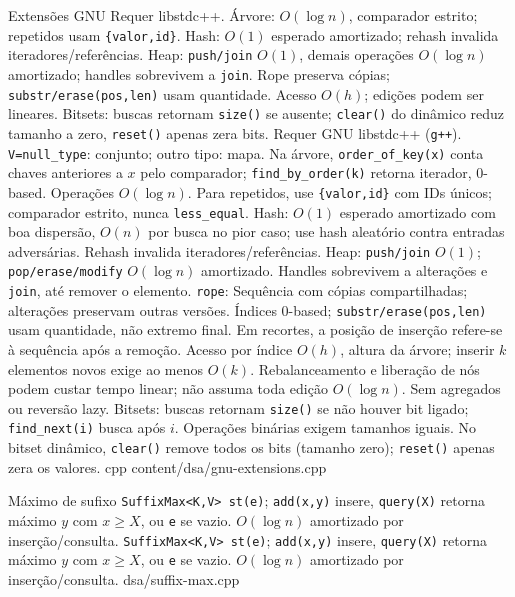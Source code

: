 \mintedentry
{Extensões GNU}
{Requer libstdc++. Árvore: $O(\log n)$, comparador estrito; repetidos usam \texttt{\{valor,id\}}. Hash: $O(1)$ esperado amortizado; rehash invalida iteradores/referências. Heap: \texttt{push/join} $O(1)$, demais operações $O(\log n)$ amortizado; handles sobrevivem a \texttt{join}. Rope preserva cópias; \texttt{substr/erase(pos,len)} usam quantidade. Acesso $O(h)$; edições podem ser lineares. Bitsets: buscas retornam \texttt{size()} se ausente; \texttt{clear()} do dinâmico reduz tamanho a zero, \texttt{reset()} apenas zera bits.}
{Requer GNU libstdc++ (\texttt{g++}). \texttt{V=null\_type}: conjunto; outro tipo: mapa. Na árvore, \texttt{order\_of\_key(x)} conta chaves anteriores a $x$ pelo comparador; \texttt{find\_by\_order(k)} retorna iterador, 0-based. Operações $O(\log n)$. Para repetidos, use \texttt{\{valor,id\}} com IDs únicos; comparador estrito, nunca \texttt{less\_equal}. Hash: $O(1)$ esperado amortizado com boa dispersão, $O(n)$ por busca no pior caso; use hash aleatório contra entradas adversárias. Rehash invalida iteradores/referências. Heap: \texttt{push/join} $O(1)$; \texttt{pop/erase/modify} $O(\log n)$ amortizado. Handles sobrevivem a alterações e \texttt{join}, até remover o elemento. \texttt{rope}: Sequência com cópias compartilhadas; alterações preservam outras versões. Índices 0-based; \texttt{substr/erase(pos,len)} usam quantidade, não extremo final. Em recortes, a posição de inserção refere-se à sequência após a remoção. Acesso por índice $O(h)$, altura da árvore; inserir $k$ elementos novos exige ao menos $O(k)$. Rebalanceamento e liberação de nós podem custar tempo linear; não assuma toda edição $O(\log n)$. Sem agregados ou reversão lazy. Bitsets: buscas retornam \texttt{size()} se não houver bit ligado; \texttt{find\_next(i)} busca após $i$. Operações binárias exigem tamanhos iguais. No bitset dinâmico, \texttt{clear()} remove todos os bits (tamanho zero); \texttt{reset()} apenas zera os valores.}
{cpp}
{content/dsa/gnu-extensions.cpp}

\ifextended

\templateentry
{Máximo de sufixo}
{\texttt{SuffixMax<K,V> st(e)}; \texttt{add(x,y)} insere, \texttt{query(X)} retorna máximo $y$ com $x\ge X$, ou \texttt{e} se vazio. $O(\log n)$ amortizado por inserção/consulta.}
{\texttt{SuffixMax<K,V> st(e)}; \texttt{add(x,y)} insere, \texttt{query(X)} retorna máximo $y$ com $x\ge X$, ou \texttt{e} se vazio. $O(\log n)$ amortizado por inserção/consulta.}
{dsa/suffix-max.cpp}

